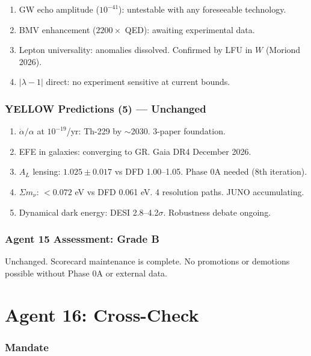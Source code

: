 \documentclass[11pt,a4paper]{article}
\begin{document}
\begin{enumerate}
\item GW echo amplitude ($10^{-41}$): untestable with any foreseeable technology.
\item BMV enhancement ($2200\times$ QED): awaiting experimental data.
\item Lepton universality: anomalies dissolved. Confirmed by LFU in $W$ (Moriond 2026).
\item $|\lambda-1|$ direct: no experiment sensitive at current bounds.
\end{enumerate}

\section{YELLOW Predictions (5) --- Unchanged}

\begin{enumerate}
\item $\dot{\alpha}/\alpha$ at $10^{-19}$/yr: Th-229 by $\sim$2030. 3-paper foundation.
\item EFE in galaxies: converging to GR. Gaia DR4 December 2026.
\item $A_L$ lensing: $1.025 \pm 0.017$ vs DFD 1.00--1.05. Phase 0A needed (8th iteration).
\item $\Sigma m_\nu$: $< 0.072$ eV vs DFD 0.061 eV. 4 resolution paths. JUNO accumulating.
\item Dynamical dark energy: DESI 2.8--4.2$\sigma$. Robustness debate ongoing.
\end{enumerate}

\section{Agent 15 Assessment: Grade B}

Unchanged. Scorecard maintenance is complete. No promotions or demotions possible without Phase 0A or external data.


\part{Agent 16: Cross-Check}
\label{part:agent16}

\section{Mandate}
\end{document}
